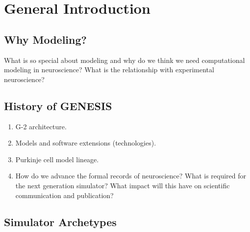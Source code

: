\documentclass[12pt]{article}
\begin{document}


\section{General Introduction}

\subsection{Why Modeling?}

What is so special about modeling and why do we think we need
computational modeling in neuroscience?  What is the relationship with
experimental neuroscience?


\subsection{History of GENESIS}

\begin{enumerate}
\item G-2 architecture.
\item Models and software extensions (technologies).
\item Purkinje cell model lineage.
\item How do we advance the formal records of neuroscience?  What is
  required for the next generation simulator?  What impact will this
  have on scientific communication and publication?
\end{enumerate}


\subsection{Simulator Archetypes}
\end{document}
